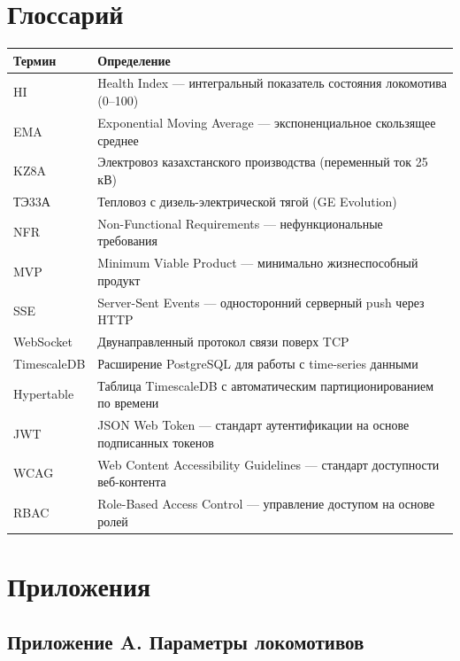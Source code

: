 \documentclass[12pt,a4paper]{article}
\begin{document}
\section{Глоссарий}

\begin{tabularx}{\textwidth}{l X}
\toprule
\textbf{Термин} & \textbf{Определение} \\
\midrule
HI & Health Index --- интегральный показатель состояния локомотива (0--100) \\
EMA & Exponential Moving Average --- экспоненциальное скользящее среднее \\
KZ8A & Электровоз казахстанского производства (переменный ток 25\,кВ) \\
ТЭ33А & Тепловоз с дизель-электрической тягой (GE Evolution) \\
NFR & Non-Functional Requirements --- нефункциональные требования \\
MVP & Minimum Viable Product --- минимально жизнеспособный продукт \\
SSE & Server-Sent Events --- односторонний серверный push через HTTP \\
WebSocket & Двунаправленный протокол связи поверх TCP \\
TimescaleDB & Расширение PostgreSQL для работы с time-series данными \\
Hypertable & Таблица TimescaleDB с автоматическим партиционированием по времени \\
JWT & JSON Web Token --- стандарт аутентификации на основе подписанных токенов \\
WCAG & Web Content Accessibility Guidelines --- стандарт доступности веб-контента \\
RBAC & Role-Based Access Control --- управление доступом на основе ролей \\
\bottomrule
\end{tabularx}


\section{Приложения}

\subsection*{Приложение A. Параметры локомотивов}
\end{document}

